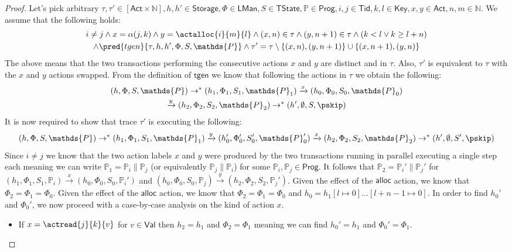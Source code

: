 \begin{proof}
Let's pick arbitrary $\tau, \tau' \in [\mathsf{Act} \times \mathds{N}], h, h' \in \mathsf{Storage}, \Phi \in \mathsf{LMan}, S \in \mathsf{TState}, \mathds{P} \in \mathsf{Prog}, i, j \in \mathsf{Tid}, k, l \in \mathsf{Key}, x, y \in \mathsf{Act}, n, m \in \mathds{N}$. We assume that the following holds:
\begin{gather*}
	i \neq j \land x = \alpha(j, k) \land y = \actalloc{i}{m}{l} \land (x, n) \in \tau \land (y, n+1) \in \tau \land (k < l \lor k \geq l + n) \\ \land \pred{tgen}{\tau, h, h', \Phi, S, \mathds{P}} \land \tau' = \tau \setminus \{(x, n), (y, n+1)\} \cup \{ (x, n+1), (y, n) \}
\end{gather*}
The above means that the two transactions performing the consecutive actions $x$ and $y$ are distinct and in $\tau$. Also, $\tau'$ is equivalent to $\tau$ with the $x$ and $y$ actions swapped. From the definition of $\mathsf{tgen}$ we know that following the actions in $\tau$ we obtain the following:
\begin{gather}
	\label{lem:ax1} (h, \Phi, S, \mathds{P}) \rightarrow^* (h_1, \Phi_1, S_1, \mathds{P}_1) \xrightarrow{x} (h_0, \Phi_0, S_0, \mathds{P}_0) \\
	\label{lem:ax2} \xrightarrow{y} (h_2, \Phi_2, S_2, \mathds{P}_2) \rightarrow^* (h', \emptyset, S, \pskip)
\end{gather}
It is now required to show that trace $\tau'$ is executing the following:
\[
	(h, \Phi, S, \mathds{P}) \rightarrow^* (h_1, \Phi_1, S_1, \mathds{P}_1) \xrightarrow{y} (h_0', \Phi_0', S_0', \mathds{P}_0') \xrightarrow{x} (h_2, \Phi_2, S_2, \mathds{P}_2) \rightarrow^* (h', \emptyset, S', \pskip)
\]
Since $i \neq j$ we know that the two action labels $x$ and $y$ were produced by the two transactions running in parallel executing a single step each meaning we can write $\mathds{P}_1 = \mathds{P}_i \| \mathds{P}_j$ (or equivalently $\mathds{P}_j \| \mathds{P}_i$) for some $\mathds{P}_i, \mathds{P}_j \in \mathsf{Prog}$. It follows that $\mathds{P}_2 = \mathds{P}_i' \| \mathds{P}_j'$ for $(h_1, \Phi_1, S_1, \mathds{P}_i) \xrightarrow{x} (h_0, \Phi_0, S_0, \mathds{P}_i')$ and $(h_0, \Phi_0, S_0, \mathds{P}_j) \xrightarrow{y} (h_2, \Phi_2, S_2, \mathds{P}_j')$. Given the effect of the $\mathsf{alloc}$ action, we know that $\Phi_2 = \Phi_1 = \Phi_0$. Given the effect of the $\mathsf{alloc}$ action, we know that $\Phi_2 = \Phi_1 = \Phi_0$ and $h_0 = h_1[l \mapsto 0]\ldots[l + n - 1 \mapsto 0]$. In order to find $h_0'$ and $\Phi_0'$, we now proceed with a case-by-case analysis on the kind of action $x$.
\begin{itemize}
	\item If $x = \actread{j}{k}{v}$ for $v \in \mathsf{Val}$ then $h_2 = h_1$ and $\Phi_2 = \Phi_1$ meaning we can find $h_0' = h_1$ and $\Phi_0' = \Phi_1$.
	

\end{itemize}
\end{proof}
